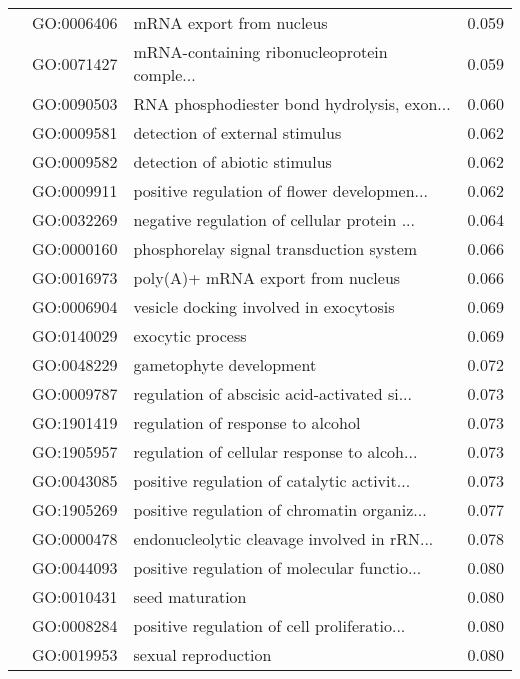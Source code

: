 \begin{longtable}{lllr}
   & GO:0006406 &                     mRNA export from nucleus &         0.059 \\
   & GO:0071427 &  mRNA-containing ribonucleoprotein comple... &         0.059 \\
   & GO:0090503 &  RNA phosphodiester bond hydrolysis, exon... &         0.060 \\
   & GO:0009581 &               detection of external stimulus &         0.062 \\
   & GO:0009582 &                detection of abiotic stimulus &         0.062 \\
   & GO:0009911 &  positive regulation of flower developmen... &         0.062 \\
   & GO:0032269 &  negative regulation of cellular protein ... &         0.064 \\
   & GO:0000160 &      phosphorelay signal transduction system &         0.066 \\
   & GO:0016973 &            poly(A)+ mRNA export from nucleus &         0.066 \\
   & GO:0006904 &       vesicle docking involved in exocytosis &         0.069 \\
   & GO:0140029 &                             exocytic process &         0.069 \\
   & GO:0048229 &                      gametophyte development &         0.072 \\
   & GO:0009787 &  regulation of abscisic acid-activated si... &         0.073 \\
   & GO:1901419 &            regulation of response to alcohol &         0.073 \\
   & GO:1905957 &  regulation of cellular response to alcoh... &         0.073 \\
   & GO:0043085 &  positive regulation of catalytic activit... &         0.073 \\
   & GO:1905269 &  positive regulation of chromatin organiz... &         0.077 \\
   & GO:0000478 &  endonucleolytic cleavage involved in rRN... &         0.078 \\
   & GO:0044093 &  positive regulation of molecular functio... &         0.080 \\
   & GO:0010431 &                              seed maturation &         0.080 \\
   & GO:0008284 &  positive regulation of cell proliferatio... &         0.080 \\
   & GO:0019953 &                          sexual reproduction &         0.080 \\

\end{longtable}
